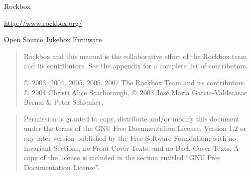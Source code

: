 %
%
%
%
%
\ifpdfoutput{
\newcommand{\latexbuild}{pdf\LaTeX}}
{\newcommand{\latexbuild}{\TeX4ht}}

%
{\begin{center}{\Large{Rockbox}}\end{center}}

\vspace{1cm}
\noindent
\begin{center}
\url{http://www.rockbox.org/}

\noindent
Open Source Jukebox Firmware
\end{center}

\vspace{6cm}
\begin{quote}
Rockbox and this manual is the collaborative effort of the
Rockbox team and its contributors. See the appendix for a complete list of
contributors.

\copyright~2003, 2004, 2005, 2006, 2007 The Rockbox Team and its contributors,
\copyright~2004 Christi Alice Scarborough,
\copyright~2003 Jos\'{e} Maria Garcia-Valdecasas Bernal \& Peter Schlenker.
\end{quote}
\vspace{3mm}
\begin{center}
\end{center}

\vspace{\fill}
\begin{quote}
  Permission is granted to copy, distribute and/or modify this document
  under the terms of the GNU Free Documentation License, Version 1.2
  or any later version published by the Free Software Foundation;
  with no Invariant Sections, no Front-Cover Texts, and no Back-Cover Texts.
  A copy of the license is included in the section entitled ``GNU
  Free Documentation License''.
\end{quote}


